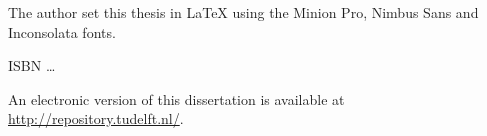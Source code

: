 \begin{titlepage}
\medskip
\medskip
\noindent The author set this thesis in \LaTeX\xspace using the Minion Pro, Nimbus Sans and Inconsolata fonts.

\vspace{\bigskipamount}



\noindent ISBN \ldots

\medskip
\noindent An electronic version of this dissertation is available at \\
\url{http://repository.tudelft.nl/}.

\end{titlepage}

